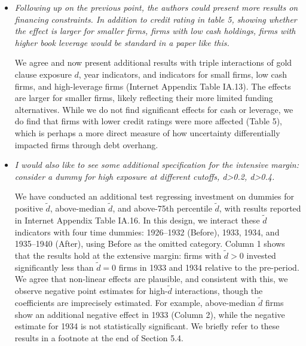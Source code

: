 \begin{itemize}
    \item[\textit{\textcolor{red!60!black}{e.}}] \textit{\textcolor{red!60!black}{
    Following up on the previous point, the authors could present more results on financing constraints. In addition to credit rating in table 5, showing whether the effect is larger for smaller firms, firms with low cash holdings, firms with higher book leverage would be standard in a paper like this.
    }}

    \bigskip

    \noindent We agree and now present additional results with triple interactions of gold clause exposure $d$, year indicators, and indicators for small firms, low cash firms, and high-leverage firms (Internet Appendix Table IA.13). The effects are larger for smaller firms, likely reflecting their more limited funding alternatives. While we do not find significant effects for cash or leverage, we do find that firms with lower credit ratings were more affected (Table 5), which is perhaps a more direct measure of how uncertainty differentially impacted firms through debt overhang.
    
    \item[\textit{\textcolor{red!60!black}{f.}}] \textit{\textcolor{red!60!black}{
    I would also like to see some additional specification for the intensive margin: consider a dummy for high exposure at different cutoffs, d>0.2, d>0.4.
    }}

    \bigskip

    \noindent We have conducted an additional test regressing investment on dummies for positive $\tilde{d}$, above-median $\tilde{d}$, and above-75th percentile $\tilde{d}$, with results reported in Internet Appendix Table IA.16. In this design, we interact these $\tilde{d}$ indicators with four time dummies: 1926–1932 (Before), 1933, 1934, and 1935–1940 (After), using Before as the omitted category. Column 1 shows that the results hold at the extensive margin: firms with $\tilde{d}>0$ invested significantly less than $\tilde{d}=0$ firms in 1933 and 1934 relative to the pre-period. We agree that non-linear effects are plausible, and consistent with this, we observe negative point estimates for high-$\tilde{d}$ interactions, though the coefficients are imprecisely estimated. For example, above-median $\tilde{d}$ firms show an additional negative effect in 1933 (Column 2), while the negative estimate for 1934 is not statistically significant. We briefly refer to these results in a footnote at the end of Section 5.4.
    

\end{itemize}
